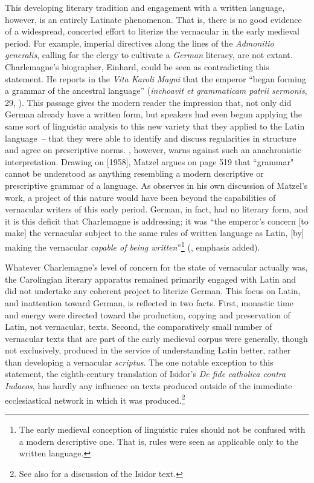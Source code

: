 This developing literary tradition and engagement with a written language, however, is an entirely Latinate phenomenon. That is, there is no good evidence of a widespread, concerted effort to literize the vernacular in the early medieval period. For example, imperial directives along the lines of the \textit{Admonitio generalis}, calling for the clergy to cultivate a \textit{German} literacy, are not extant. Charlemagne’s biographer, Einhard, could be seen as contradicting this statement. He reports in the \textit{Vita Karoli} \textit{Magni} that the emperor “began forming a grammar of the ancestral language” (\textit{inchoavit et grammaticam patrii sermonis}, 29, \citealt{Einhard1880}). This passage gives the modern reader the impression that, not only did German already have a written form, but speakers had even begun applying the same sort of linguistic analysis to this new variety that they applied to the Latin language~-- that they were able to identify and discuss regularities in structure and agree on prescriptive norms. \citet[516--520]{Matzel1970}, however, warns against such an anachronistic interpretation. Drawing on \citet{Grundmann2019} [1958], Matzel argues on page 519 that “grammar" cannot be understood as anything resembling a modern descriptive or prescriptive grammar of a language. As \citet[49]{Green1994} observes in his own discussion of Matzel’s work, a project of this nature would have been beyond the capabilities of vernacular writers of this early period. German, in fact, had no literary form, and it is this deficit that Charlemagne is addressing; it was “the emperor’s concern [to make] the vernacular subject to the same rules of written language as Latin, [by] making the vernacular \textit{capable of being written}”\footnote{The early medieval conception of linguistic rules should not be confused with a modern descriptive one. That is, rules were seen as applicable only to the written language.} (\citealt[49]{Green1994}, emphasis added).

Whatever Charlemagne’s level of concern for the state of vernacular actually was, the Carolingian literary apparatus remained primarily engaged with Latin and did not undertake any coherent project to literize German. This focus on Latin, and inattention toward German, is reflected in two facts. First, monastic time and energy were directed toward the production, copying and preservation of Latin, not vernacular, texts. Second, the comparatively small number of vernacular texts that are part of the early medieval corpus were generally, though not exclusively, produced in the service of understanding Latin better, rather than developing a vernacular \textit{scriptus}. The one notable exception to this statement, the eighth-century translation of Isidor’s \textit{De fide} \textit{catholica contra Iudaeos}, has hardly any influence on texts produced outside of the immediate ecclesiastical network in which it was produced.\footnote{See also  for a discussion of the Isidor text.}

